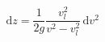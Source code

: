 \documentclass{article}
\begin{document}
\begin{adjustwidth}{-3cm}{-3cm}


\newenvironment{enumeratebf}{
    \begin{enumerate}[label=\textbf{\arabic*.}]
}
{
    \end{enumerate}
}

\newcommand{\notion}[1]{\textcolor{vert_fonce}{\textit{#1}}}
\newcommand{\mb}[1]{\mathbb{#1}}
\newcommand{\mc}[1]{\mathcal{#1}}
\newcommand{\code}[1]{\texttt{#1}}
\newcommand{\ccode}[1]{\texttt{|#1|}}
\newcommand{\ov}[1]{\overline{#1}}
\newcommand{\abs}[1]{|#1|}
\newcommand{\rev}[1]{\texttt{reverse(#1)}}
\newcommand{\crev}[1]{\texttt{|reverse(#1)|}}

\newcommand{\ie}{\textit{i.e.} }

\newcommand{\N}{\mathbb{N}}
\newcommand{\R}{\mathbb{R}}
\newcommand{\C}{\mathbb{C}}
\newcommand{\K}{\mathbb{K}}

\newcommand{\A}{\mathcal{A}}
\newcommand{\bigO}{\mathcal{O}}
\renewcommand{\L}{\mathcal{L}}

\newcommand{\rg}[0]{\text{rg}}
\newcommand{\re}[0]{\text{Re}}
\newcommand{\im}[0]{\text{Im}}
\newcommand{\mat}[1]{\text{Mat}_{#1}}
\newcommand{\matrice}[1]{\mathcal{M}_{#1}}
\newcommand{\norme}[1]{||#1||}
\renewcommand{\d}[1]{\,\text{d}#1}
\newcommand{\intint}[2]{\llbracket #1 ,\, #2 \rrbracket}
\newcommand{\seg}[2]{[#1\, ; \, #2]}
\newcommand{\scal}[2]{\left\langle #1 ,\, #2 \right\rangle}
\newcommand{\inte}[2]{\int_{#1}^{#2}}
\newcommand{\somme}[2]{\sum_{#1}^{#2}}




$$\d{z} = \frac{1}{2g} \frac{v_l^2}{v^2-v_l^2} \d{v^2}$$

\end{adjustwidth}
\end{document}
